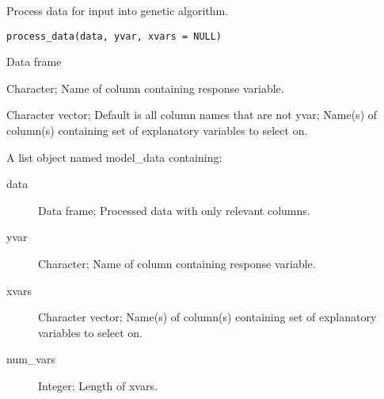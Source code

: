 %
\begin{Description}\relax
Process data for input into genetic algorithm.
\end{Description}
%
\begin{Usage}
\begin{verbatim}
process_data(data, yvar, xvars = NULL)
\end{verbatim}
\end{Usage}
%
\begin{Arguments}
\begin{ldescription}
\item[\code{data}] Data frame

\item[\code{yvar}] Character; Name of column containing response variable.

\item[\code{xvars}] Character vector; Default is all column names that are not yvar;
Name(s) of column(s) containing set of explanatory variables to select on.
\end{ldescription}
\end{Arguments}
%
\begin{Value}
A list object named model\_data containing:
\begin{description}

\item[data] Data frame; Processed data with only relevant columns.
\item[yvar] Character; Name of column containing response variable.
\item[xvars] Character vector; Name(s) of column(s) containing
set of explanatory variables to select on.
\item[num\_vars] Integer; Length of xvars.

\end{description}

\end{Value}

